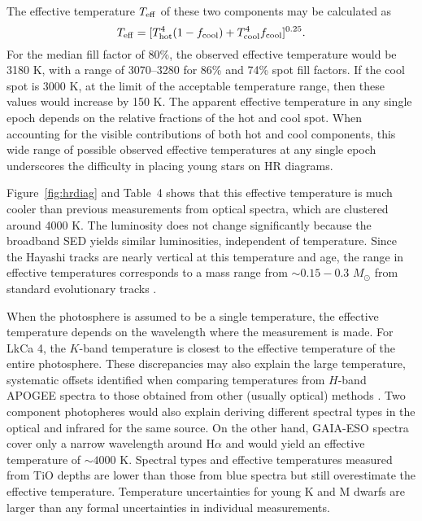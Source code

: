\documentclass[twocolumn]{emulateapj}%
\begin{document}
The effective temperature $T_{\rm eff}$ of these two components may be calculated as
\begin{equation}
T_{\rm eff}=[T_{\rm hot}^4(1-f_{\mathrm{cool}})+T_{\mathrm{cool}}^4 f_{\mathrm{cool}}]^{0.25}.
\end{equation}
For the median fill factor of 80\%, the observed effective temperature would be 3180 K, with a range of 3070--3280 for 86\% and 74\% spot fill factors.  If the cool spot is 3000 K, at the limit of the acceptable temperature range, then these values would increase by 150 K.  The apparent effective temperature in any single epoch depends on the relative fractions of the hot and cool spot.  When accounting for the visible contributions of both hot and cool components, this wide range of possible observed effective temperatures at any single epoch underscores the difficulty in placing young stars on HR diagrams.  

Figure~\ref{fig:hrdiag} and Table~4 shows that this effective temperature is much cooler than previous measurements from optical spectra, which are clustered around 4000 K.  The luminosity does not change significantly because the broadband SED yields similar luminosities, independent of temperature.
Since the Hayashi tracks are nearly vertical at this temperature and age, the range in effective temperatures corresponds to a mass range from $\sim 0.15-0.3$ $M_\odot$ from standard evolutionary tracks \citep{baraffe15}. 

When the photosphere is assumed to be a single temperature, the effective temperature depends on the wavelength where the measurement is made.  For LkCa 4, the $K$-band temperature  is closest to the effective temperature of the entire photosphere.  These discrepancies may also explain the large temperature, systematic offsets identified when comparing temperatures from $H$-band APOGEE spectra to those obtained from other (usually optical) methods \citep{cottaar14}.  Two component photopheres would also explain deriving different spectral types in the optical and infrared for the same source.
On the other hand, GAIA-ESO spectra \citep{frasca15} cover only a narrow wavelength around H$\alpha$ and would yield an effective temperature of $\sim 4000$ K.   Spectral types and effective temperatures measured from TiO depths \citep{herczeg14} are lower than those from blue spectra but still overestimate the effective temperature.  Temperature uncertainties for young K and M dwarfs are larger than any formal uncertainties in individual measurements.
\end{document}
